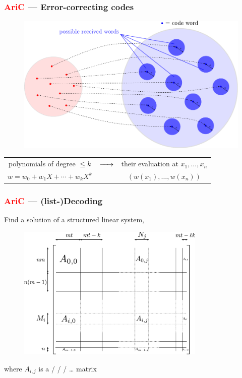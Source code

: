 \documentclass[c]{beamer}
\begin{document}
\begin{frame}
	\frametitle{\textcolor{red}{AriC} --- Error-correcting codes}

	\begin{figure}
		\centering
		\includegraphics[width=\textwidth]{figures/encoding_schema_balls_radius_e.pdf}
	\end{figure}

	\hspace{-1.1cm}
	\begin{tabular}{ccc}
		polynomials of degree $\leqslant k$ & $\xrightarrow{\hspace*{0.5cm}}$ & their evaluation at $x_1,\ldots,x_n$ \\
		$w = w_0 + w_1 X + \cdots + w_k X^k$ & & $(w(x_1),\ldots,w(x_n))$
	\end{tabular}
\end{frame}


\begin{frame}
	\frametitle{\textcolor{red}{AriC} --- (list-)Decoding}

	Find a \alert{solution} of a \alert{structured linear system},
	\begin{figure}
		\centering
		\includegraphics[width=0.8\textwidth]{figures/block_hankel_system.pdf}
	\end{figure}
	where $A_{i,j}$ is a  /  
	/  / \ldots{} matrix
\end{frame}
\end{document}
